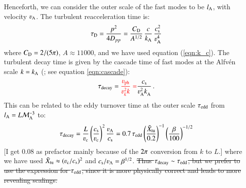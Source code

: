 \documentclass[fleqn,usenatbib,useAMS]{mnras}
\newcommand\cp[1]{{\color{red} #1}}
\begin{document}
Henceforth, we can consider the outer scale of the fast modes to be $l_{\rm A}$, with velocity $\varv_{\rm A}$. The turbulent reacceleration time is: 
\cp{
  \begin{equation}
\tau_{\rm D} = \frac{p^{2}}{4 D_{pp}} = \frac{C_{\rm D}}{A^{1/2}}\, \frac{c}{k_{\rm A}}\, \frac{c_{\rm s}^{2}}{\varv_{\rm A}^{4}}
\label{eqn:tau_D} 
\end{equation}
}
where $C_{\rm D} = 2/(5 \pi)$, $A\approx 11000$, and we have used equation (\ref{eqn:k_c}). The turbulent decay time is given by the cascade time of fast modes \cp{at the Alfv\'en scale $k=k_{{\mathrm{A}}}$} (\citealt{2004ApJ...614..757Y}; see equation \ref{eqn:cascade}): 
\begin{equation}
  \tau_{\rm decay} = \cp{\frac{\varv_{\rm ph}}{\varv_k^{2} k} = }
  \frac{c_{\rm s}}{\varv_{\rm A}^{2} k_{\rm A}^{}}\,.
\label{eqn:tau_decay} 
\end{equation}
This can be related to the eddy turnover time at the outer scale $\tau_{\rm edd}$ from $l_{\rm A} = L \mathcal{M}_{\rm A}^{-3}$ to: 
\begin{equation}
\tau_{\rm decay} =\frac{L}{\varv_{\rm c}} \left(\frac{c_{\rm s}}{\varv_{\rm c}} \right)^{2} \frac{\varv_{\rm A}}{c_{\rm s}} = 0.7 \, \tau_{\rm edd} \left(\frac{\tilde{X}_{\rm tu}}{0.2}\right)^{-1}  \left(\frac{\beta}{100} \right)^{-1/2}
\end{equation}
\cp{[I get 0.08 as prefactor mainly because of the $2\pi$ conversion from $k$ to $L$.]}
where we have used $\tilde{X}_{\rm tu} \approx (\varv_{\rm c}/c_{\rm s})^{2}$ and $c_{\rm s}/\varv_{\rm A} = \beta^{1/2}$. \cp{\sout{Thus $\tau_{\rm decay} \sim \tau_{\rm edd}$, but we prefer to use the expression for $\tau_{\rm edd}$, since it is more physically correct and leads to more revealing scalings. }}
\end{document}
